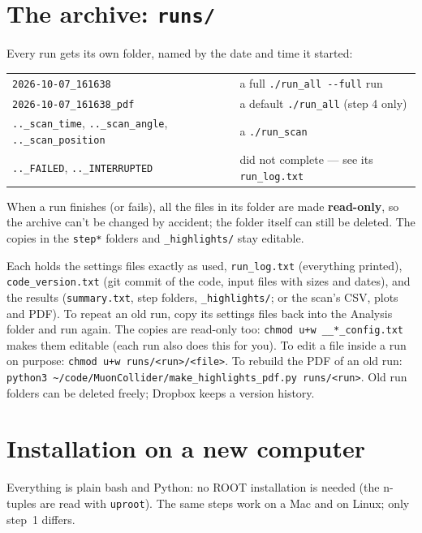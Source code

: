 \documentclass[11pt,letterpaper]{article}
\newcommand{\code}[1]{\texttt{#1}}
\begin{document}
\section{The archive: \code{runs/}}
Every run gets its own folder, named by the date and time it started:

\begin{tabularx}{\linewidth}{@{}l >{\raggedright\arraybackslash}X@{}}
\toprule
\code{2026-10-07\_161638} & a full \code{./run\_all -{}-full} run\\
\code{2026-10-07\_161638\_pdf} & a default \code{./run\_all} (step 4 only)\\
\code{..\_scan\_time}, \code{..\_scan\_angle}, \code{..\_scan\_position} & a \code{./run\_scan}\\
\code{..\_FAILED}, \code{..\_INTERRUPTED} & did not complete --- see its \code{run\_log.txt}\\
\bottomrule
\end{tabularx}

When a run finishes (or fails), all the files in its folder are made
\textbf{read-only}, so the archive can't be changed by accident; the
folder itself can still be deleted. The copies in the \code{step*} folders
and \code{\_highlights/} stay editable.

Each holds the settings files exactly as used, \code{run\_log.txt}
(everything printed), \code{code\_version.txt} (git commit of the code,
input files with sizes and dates), and the results (\code{summary.txt},
step folders, \code{\_highlights/}; or the scan's CSV, plots and PDF). To
repeat an old run, copy its settings files back into the Analysis folder
and run again. The copies are read-only too:
\code{chmod u+w \_\_*\_config.txt} makes them editable (each run also
does this for you). To edit a file inside a run on purpose:
\code{chmod u+w runs/<run>/<file>}. To rebuild the PDF of an old run:
\code{python3 \textasciitilde/code/MuonCollider/make\_highlights\_pdf.py runs/<run>}.
Old run folders can be deleted freely; Dropbox keeps a version history.

\section{Installation on a new computer}\label{sec:install}
Everything is plain bash and Python: no ROOT installation is needed (the
n-tuples are read with \code{uproot}). The same steps work on a Mac and on
Linux; only step~1 differs.
\end{document}
